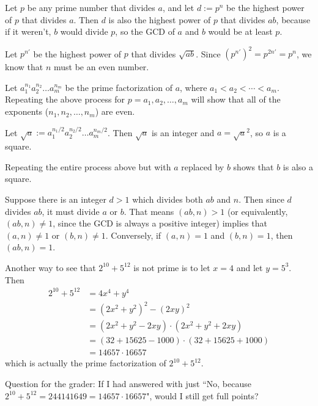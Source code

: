 \documentclass[12pt]{article}
\begin{document}
Let $p$ be any prime number that divides $a$, and let $d := p^n$ be the highest power of $p$ that divides $a$. Then $d$ is also the highest power of $p$ that divides $ab$, because if it weren't, $b$ would divide $p$, so the GCD of $a$ and $b$ would be at least $p$.
\par
Let $p^{n'}$ be the highest power of $p$ that divides $\sqrt{ab}$. Since $\left( p^{n'} \right)^2 = p^{2n'} = p^{n}$, we know that $n$ must be an even number.
\par
Let $a_1^{n_1} a_2^{n_2} \dots a_m^{n_m}$ be the prime factorization of $a$, where $a_1 < a_2 < \cdots < a_m$. Repeating the above process for $p=a_1, a_2, \dots, a_m$ will show that all of the exponents ($n_1, n_2, \dots, n_m$) are even.
\par
Let $\sqrt{a} := a_1^{n_1/2} a_2^{n_2/2} \dots a_m^{n_m/2}$. Then $\sqrt{a}$ is an integer and $a = \sqrt{a}^2$, so $a$ is a square.
\par
Repeating the entire process above but with $a$ replaced by $b$ shows that $b$ is also a square.

\bigskip
\noindent{}\bigskip

Suppose there is an integer $d > 1$ which divides both $ab$ and $n$. Then since $d$ divides $ab$, it must divide $a$ or $b$. That means $(ab, n) > 1$ (or equivalently, $(ab,n) \neq 1$, since the GCD is always a positive integer) implies that $(a,n) \neq 1$ or $(b,n) \neq 1$. Conversely, if $(a,n)=1$ and $(b,n)=1$, then $(ab,n)=1$.

\bigskip
\noindent{}\bigskip

Another way to see that $2^{10} + 5^{12}$ is not prime is to let $x=4$ and let $y=5^3$. Then
\begin{align*}
    2^{10} + 5^{12} &= 4x^4 + y^4 \\
                    &= (2x^2 + y^2)^2 - (2xy)^2 \\
                    &= (2x^2 + y^2 - 2xy) \cdot (2x^2 + y^2 + 2xy) \\
                    &= (32 + 15625 - 1000) \cdot (32 + 15625 + 1000) \\
                    &= 14657 \cdot 16657
\end{align*}
which is actually the prime factorization of $2^{10} + 5^{12}$.
\par
Question for the grader: If I had answered with just ``No, because $2^{10} + 5^{12} = 244141649 = 14657 \cdot 16657$", would I still get full points?
\end{document}
